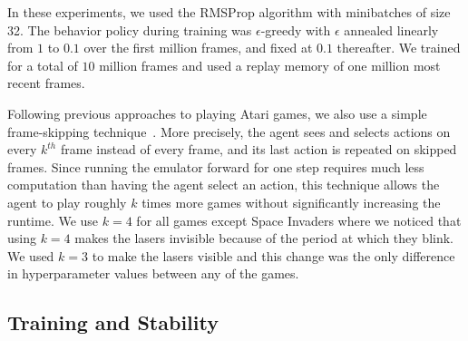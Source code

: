 \documentclass{article} \usepackage{nips13submit_e,times}
\begin{document}
In these experiments, we used the RMSProp algorithm with minibatches of size 32.  The behavior policy during training was $\epsilon$-greedy with $\epsilon$ annealed linearly from $1$ to $0.1$ over the first million frames, and fixed at $0.1$ thereafter.  We trained for a total of $10$ million frames and used a replay memory of one million most recent frames.

Following previous approaches to playing Atari games, we also use a simple frame-skipping technique~\cite{bellemare-ale}. More precisely, the agent sees and selects actions on every $k^{th}$ frame instead of every frame, and its last action is repeated on skipped frames.  Since running the emulator forward for one step requires much less computation than having the agent select an action, this technique allows the agent to play roughly $k$ times more games without significantly increasing the runtime.  We use $k=4$ for all games except Space Invaders where we noticed that using $k=4$ makes the lasers invisible because of the period at which they blink.  We used $k=3$ to make the lasers visible and this change was the only difference in hyperparameter values between any of the games.

\subsection{Training and Stability}
\end{document}
